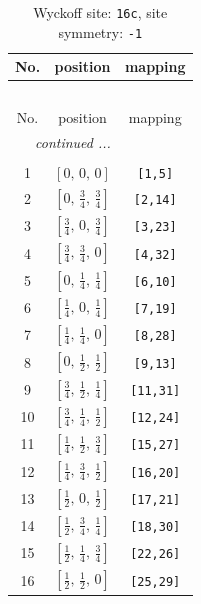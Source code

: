 \documentclass[fleqn,8pt]{jsarticle}
\begin{document}
\begin{longtable}{ccc}
\caption{Wyckoff site: {\tt 16c}, site symmetry: {\tt -1}}
 \\
 \hline \hline
No. & position & mapping \\ \hline \endfirsthead

\multicolumn{2}{l}{\tablename\ \thetable{}} \\
 \hline \hline
No. & position & mapping \\ \hline \endhead

 \hline \hline
\multicolumn{2}{r}{\footnotesize\it continued ...} \\ \endfoot

 \hline \hline
\multicolumn{2}{r}{} \\ \endlastfoot

1 & $\left[ 0,\, 0,\, 0 \right]$ & {\tt [1,5]} \\ \hline
2 & $\left[ 0,\, \frac{3}{4},\, \frac{3}{4} \right]$ & {\tt [2,14]} \\ \hline
3 & $\left[ \frac{3}{4},\, 0,\, \frac{3}{4} \right]$ & {\tt [3,23]} \\ \hline
4 & $\left[ \frac{3}{4},\, \frac{3}{4},\, 0 \right]$ & {\tt [4,32]} \\ \hline
5 & $\left[ 0,\, \frac{1}{4},\, \frac{1}{4} \right]$ & {\tt [6,10]} \\ \hline
6 & $\left[ \frac{1}{4},\, 0,\, \frac{1}{4} \right]$ & {\tt [7,19]} \\ \hline
7 & $\left[ \frac{1}{4},\, \frac{1}{4},\, 0 \right]$ & {\tt [8,28]} \\ \hline
8 & $\left[ 0,\, \frac{1}{2},\, \frac{1}{2} \right]$ & {\tt [9,13]} \\ \hline
9 & $\left[ \frac{3}{4},\, \frac{1}{2},\, \frac{1}{4} \right]$ & {\tt [11,31]} \\ \hline
10 & $\left[ \frac{3}{4},\, \frac{1}{4},\, \frac{1}{2} \right]$ & {\tt [12,24]} \\ \hline
11 & $\left[ \frac{1}{4},\, \frac{1}{2},\, \frac{3}{4} \right]$ & {\tt [15,27]} \\ \hline
12 & $\left[ \frac{1}{4},\, \frac{3}{4},\, \frac{1}{2} \right]$ & {\tt [16,20]} \\ \hline
13 & $\left[ \frac{1}{2},\, 0,\, \frac{1}{2} \right]$ & {\tt [17,21]} \\ \hline
14 & $\left[ \frac{1}{2},\, \frac{3}{4},\, \frac{1}{4} \right]$ & {\tt [18,30]} \\ \hline
15 & $\left[ \frac{1}{2},\, \frac{1}{4},\, \frac{3}{4} \right]$ & {\tt [22,26]} \\ \hline
16 & $\left[ \frac{1}{2},\, \frac{1}{2},\, 0 \right]$ & {\tt [25,29]} \\
\end{longtable}
\end{document}
